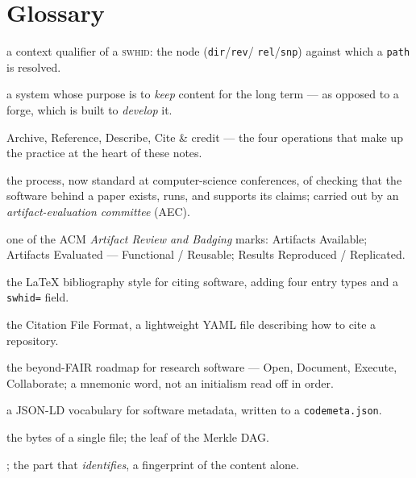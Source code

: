\chapter{Glossary}
\label{app:glossary}

\sloppy
\begin{description}[leftmargin=!,labelwidth=3.1cm,font=\bfseries,style=nextline]
  \item[Anchor] a context qualifier of a \textsc{swhid}: the node (\texttt{dir}/\texttt{rev}/%
        \texttt{rel}/\texttt{snp}) against which a \texttt{path} is resolved.
  \item[Archive] a system whose purpose is to \emph{keep} content for the long term --- as opposed
        to a forge, which is built to \emph{develop} it.
  \item[ARDC] Archive, Reference, Describe, Cite \& credit --- the four operations that make up the
        practice at the heart of these notes.
  \item[Artifact evaluation (AEC)] the process, now standard at computer-science conferences, of
        checking that the software behind a paper exists, runs, and supports its claims; carried out
        by an \emph{artifact-evaluation committee} (AEC).
  \item[Badge (ACM)] one of the ACM \emph{Artifact Review and Badging} marks: Artifacts Available;
        Artifacts Evaluated --- Functional / Reusable; Results Reproduced / Replicated.
  \item[\texttt{biblatex-software}] the \LaTeX{} bibliography style for citing software, adding four
        entry types and a \texttt{swhid=} field.
  \item[CITATION.cff] the Citation File Format, a lightweight YAML file describing how to cite a
        repository.
  \item[CODE] the beyond-FAIR roadmap for research software --- Open, Document, Execute,
        Collaborate; a mnemonic word, not an initialism read off in order.
  \item[CodeMeta] a JSON-LD vocabulary for software metadata, written to a \texttt{codemeta.json}.
  \item[Content (\texttt{cnt})] the bytes of a single file; the leaf of the Merkle DAG.
  \item[Core SWHID] ; the part that \emph{identifies}, a
        fingerprint of the content alone.

\end{description}
